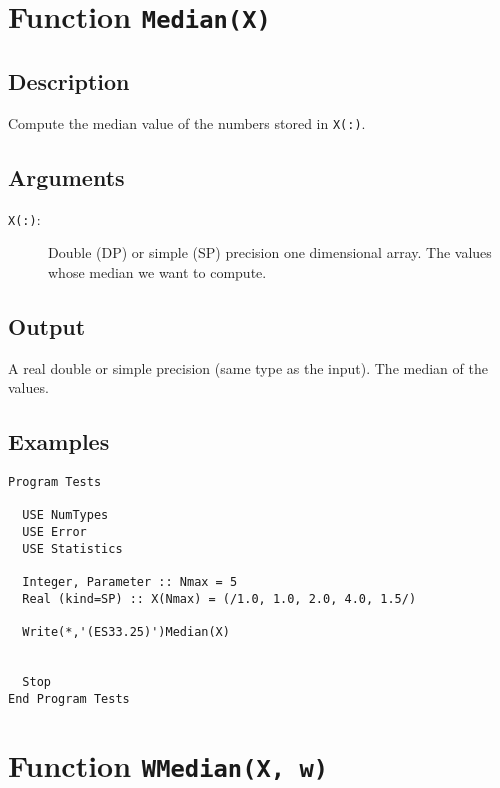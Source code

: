 \section{Function \texttt{Median(X)}}

\subsection{Description}

Compute the median value of the numbers stored in \texttt{X(:)}.

\subsection{Arguments}

\begin{description}
\item[\texttt{X(:)}:] Double (DP) or simple (SP) precision one
  dimensional array. The values  whose median we want to compute.
\end{description}

\subsection{Output}

A real double or simple precision (same type as the input). The median
of the values.

\subsection{Examples}

\begin{lstlisting}[emph=Median,
                   emphstyle=\color{blue},
                   frame=trBL,
                   caption=Computing the Median of a vector of numbers.,
                   label=mean]
Program Tests

  USE NumTypes
  USE Error
  USE Statistics

  Integer, Parameter :: Nmax = 5
  Real (kind=SP) :: X(Nmax) = (/1.0, 1.0, 2.0, 4.0, 1.5/)  

  Write(*,'(ES33.25)')Median(X)


  Stop
End Program Tests
\end{lstlisting}

\section{Function \texttt{WMedian(X, w)}}

